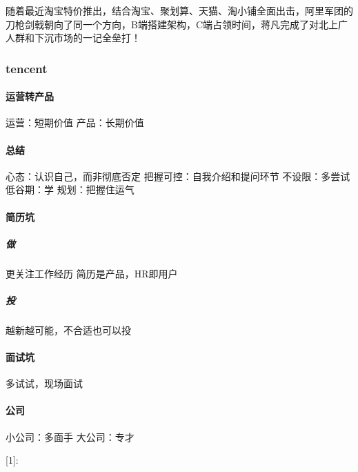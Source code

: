 \documentclass[letterpaper,11pt,english]{sphinxmanual}
\begin{document}
随着最近淘宝特价推出，结合淘宝、聚划算、天猫、淘小铺全面出击，阿里军团的刀枪剑戟朝向了同一个方向，B端搭建架构，C端占领时间，蒋凡完成了对北上广人群和下沉市场的一记全垒打！


\subsubsection{tencent}
\label{\detokenize{chapter_experience/tencent:tencent}}\label{\detokenize{chapter_experience/tencent::doc}}

\paragraph{运营转产品}
\label{\detokenize{chapter_experience/tencent:id1}}
运营：短期价值 产品：长期价值


\paragraph{总结}
\label{\detokenize{chapter_experience/tencent:id2}}
心态：认识自己，而非彻底否定 把握可控：自我介绍和提问环节 不设限：多尝试
低谷期：学 规划：把握住运气


\paragraph{简历坑}
\label{\detokenize{chapter_experience/tencent:id3}}

\subparagraph{做}
\label{\detokenize{chapter_experience/tencent:id4}}
更关注工作经历 简历是产品，HR即用户


\subparagraph{投}
\label{\detokenize{chapter_experience/tencent:id5}}
越新越可能，不合适也可以投


\paragraph{面试坑}
\label{\detokenize{chapter_experience/tencent:id6}}
多试试，现场面试


\paragraph{公司}
\label{\detokenize{chapter_experience/tencent:id7}}
小公司：多面手 大公司：专才

{[}1{]}: %
\begin{footnote}[212]\sphinxAtStartFootnote
{}
%
\end{footnote}
\end{document}
